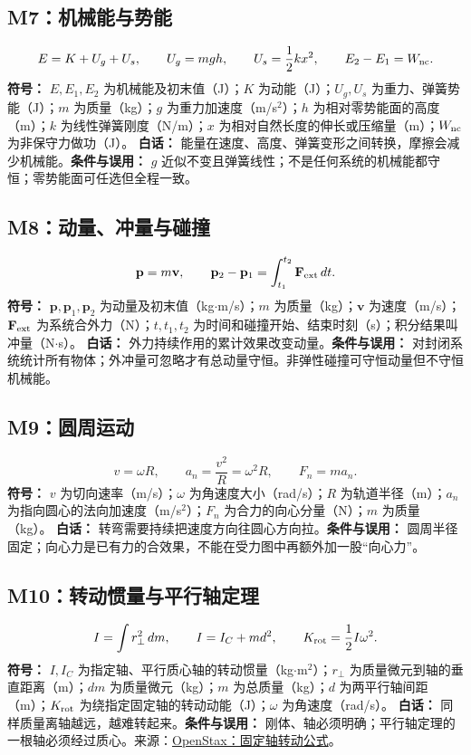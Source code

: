 \subsection{M7：机械能与势能}
\begin{equation}
E=K+U_g+U_s,\qquad U_g=mgh,\qquad U_s=\frac12kx^2,\qquad E_2-E_1=W_{\rm nc}.
\end{equation}
\textbf{符号：} $E,E_1,E_2$ 为机械能及初末值（J）；$K$ 为动能（J）；$U_g,U_s$ 为重力、弹簧势能（J）；$m$ 为质量（kg）；$g$ 为重力加速度（m/s$^2$）；$h$ 为相对零势能面的高度（m）；$k$ 为线性弹簧刚度（N/m）；$x$ 为相对自然长度的伸长或压缩量（m）；$W_{\rm nc}$ 为非保守力做功（J）。
\textbf{白话：} 能量在速度、高度、弹簧变形之间转换，摩擦会减少机械能。\textbf{条件与误用：} $g$ 近似不变且弹簧线性；不是任何系统的机械能都守恒；零势能面可任选但全程一致。

\subsection{M8：动量、冲量与碰撞}
\begin{equation}
\mathbf p=m\mathbf v,\qquad \mathbf p_2-\mathbf p_1=\int_{t_1}^{t_2}\mathbf F_{\rm ext}\,dt.
\end{equation}
\textbf{符号：} $\mathbf p,\mathbf p_1,\mathbf p_2$ 为动量及初末值（kg$\cdot$m/s）；$m$ 为质量（kg）；$\mathbf v$ 为速度（m/s）；$\mathbf F_{\rm ext}$ 为系统合外力（N）；$t,t_1,t_2$ 为时间和碰撞开始、结束时刻（s）；积分结果叫冲量（N$\cdot$s）。
\textbf{白话：} 外力持续作用的累计效果改变动量。\textbf{条件与误用：} 对封闭系统统计所有物体；外冲量可忽略才有总动量守恒。非弹性碰撞可守恒动量但不守恒机械能。

\subsection{M9：圆周运动}
\begin{equation}
v=\omega R,\qquad a_n=\frac{v^2}{R}=\omega^2R,\qquad F_n=ma_n.
\end{equation}
\textbf{符号：} $v$ 为切向速率（m/s）；$\omega$ 为角速度大小（rad/s）；$R$ 为轨道半径（m）；$a_n$ 为指向圆心的法向加速度（m/s$^2$）；$F_n$ 为合力的向心分量（N）；$m$ 为质量（kg）。
\textbf{白话：} 转弯需要持续把速度方向往圆心方向拉。\textbf{条件与误用：} 圆周半径固定；向心力是已有力的合效果，不能在受力图中再额外加一股“向心力”。

\subsection{M10：转动惯量与平行轴定理}
\begin{equation}
I=\int r_\perp^2\,dm,\qquad I=I_C+md^2,\qquad K_{\rm rot}=\frac12I\omega^2.
\end{equation}
\textbf{符号：} $I,I_C$ 为指定轴、平行质心轴的转动惯量（kg$\cdot$m$^2$）；$r_\perp$ 为质量微元到轴的垂直距离（m）；$dm$ 为质量微元（kg）；$m$ 为总质量（kg）；$d$ 为两平行轴间距（m）；$K_{\rm rot}$ 为绕指定固定轴的转动动能（J）；$\omega$ 为角速度（rad/s）。
\textbf{白话：} 同样质量离轴越远，越难转起来。\textbf{条件与误用：} 刚体、轴必须明确；平行轴定理的一根轴必须经过质心。来源：\href{https://openstax.org/books/university-physics-volume-1/pages/10-key-equations}{OpenStax：固定轴转动公式}。

